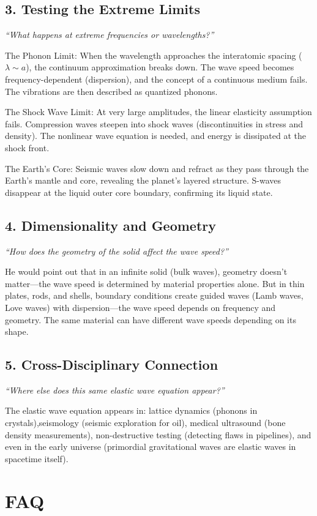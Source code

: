 \subsection*{3. Testing the Extreme Limits}
\textit{``What happens at extreme frequencies or wavelengths?''}

The Phonon Limit: When the wavelength approaches the interatomic spacing ($\lambda \sim a$), the continuum approximation breaks down. The wave speed becomes frequency-dependent (dispersion), and the concept of a continuous medium fails. The vibrations are then described as quantized phonons.

The Shock Wave Limit: At very large amplitudes, the linear elasticity assumption fails. Compression waves steepen into shock waves (discontinuities in stress and density). The nonlinear wave equation is needed, and energy is dissipated at the shock front.

The Earth's Core: Seismic waves slow down and refract as they pass through the Earth's mantle and core, revealing the planet's layered structure. S-waves disappear at the liquid outer core boundary, confirming its liquid state.

\subsection*{4. Dimensionality and Geometry}
\textit{``How does the geometry of the solid affect the wave speed?''}

He would point out that in an infinite solid (bulk waves), geometry doesn't matter---the wave speed is determined by material properties alone. But in thin plates, rods, and shells, boundary conditions create guided waves (Lamb waves, Love waves) with dispersion---the wave speed depends on frequency and geometry. The same material can have different wave speeds depending on its shape.

\subsection*{5. Cross-Disciplinary Connection}
\textit{``Where else does this same elastic wave equation appear?''}

The elastic wave equation appears in: lattice dynamics (phonons in crystals),seismology (seismic exploration for oil), medical ultrasound (bone density measurements), non-destructive testing (detecting flaws in pipelines), and even in the early universe (primordial gravitational waves are elastic waves in spacetime itself).
\section*{FAQ}

